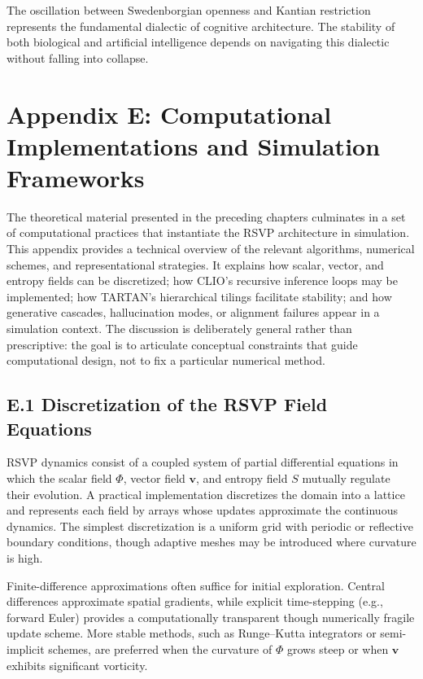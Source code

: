 \documentclass[12pt]{article}
\begin{document}
The oscillation between Swedenborgian openness and Kantian restriction 
represents the fundamental dialectic of cognitive architecture. The stability 
of both biological and artificial intelligence depends on navigating this 
dialectic without falling into collapse.

\newpage
\section*{Appendix E: Computational Implementations and Simulation Frameworks}

The theoretical material presented in the preceding chapters culminates in a 
set of computational practices that instantiate the RSVP architecture in 
simulation. This appendix provides a technical overview of the relevant 
algorithms, numerical schemes, and representational strategies. It explains 
how scalar, vector, and entropy fields can be discretized; how CLIO’s 
recursive inference loops may be implemented; how TARTAN's hierarchical 
tilings facilitate stability; and how generative cascades, hallucination 
modes, or alignment failures appear in a simulation context.  
The discussion is deliberately general rather than prescriptive: the goal is 
to articulate conceptual constraints that guide computational design, not to 
fix a particular numerical method.

\subsection*{E.1 Discretization of the RSVP Field Equations}

RSVP dynamics consist of a coupled system of partial differential equations in 
which the scalar field $\Phi$, vector field $\mathbf{v}$, and entropy field 
$S$ mutually regulate their evolution. A practical implementation discretizes 
the domain into a lattice and represents each field by arrays whose updates 
approximate the continuous dynamics. The simplest discretization is a uniform 
grid with periodic or reflective boundary conditions, though adaptive meshes 
may be introduced where curvature is high.

Finite-difference approximations often suffice for initial exploration.  
Central differences approximate spatial gradients, while explicit time-stepping 
(e.g., forward Euler) provides a computationally transparent though 
numerically fragile update scheme. More stable methods, such as 
Runge–Kutta integrators or semi-implicit schemes, are preferred when the 
curvature of $\Phi$ grows steep or when $\mathbf{v}$ exhibits significant 
vorticity.
\end{document}
